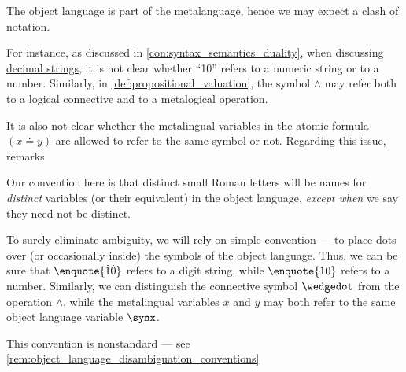 \begin{remark}\label{rem:object_language_dots}
  The object language is part of the metalanguage, hence we may expect a clash of notation.

  For instance, as discussed in \cref{con:syntax_semantics_duality}, when discussing \hyperref[def:positional_number_system/decimal]{decimal strings}, it is not clear whether \enquote{10} refers to a numeric string or to a number. Similarly, in \cref{def:propositional_valuation}, the symbol \( {\wedge} \) may refer both to a logical connective and to a metalogical operation.

  It is also not clear whether the metalingual variables in the \hyperref[def:first_order_syntax/atomic_formula]{atomic formula} \( (x \doteq y) \) are allowed to refer to the same symbol or not. Regarding this issue,  remarks
  \begin{displayquote}
    Our convention here is that distinct small Roman letters will be names for \textit{distinct} variables (or their equivalent) in the object language, \textit{except when} we say they need not be distinct.
  \end{displayquote}

  To surely eliminate ambiguity, we will rely on simple convention --- to place dots over (or occasionally inside) the symbols of the object language. Thus, we can be sure that \( \enquote{\syn1\syn0} \) refers to a digit string, while \( \enquote{10} \) refers to a number. Similarly, we can distinguish the connective symbol \( {\synwedge} \) from the operation \( {\wedge} \), while the metalingual variables \( x \) and \( y \) may both refer to the same object language variable \( \synx \).
\end{remark}
\begin{comments}
  \item This convention is nonstandard --- see \cref{rem:object_language_disambiguation_conventions}
\end{comments}

